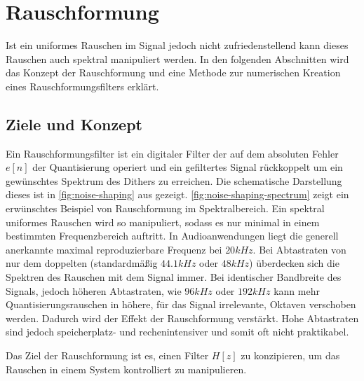 \section{Rauschformung}

Ist ein uniformes Rauschen im Signal jedoch nicht zufriedenstellend kann dieses Rauschen auch spektral manipuliert werden.
In den folgenden Abschnitten wird das Konzept der Rauschformung und eine Methode zur numerischen Kreation eines Rauschformungsfilters erklärt.

\subsection{Ziele und Konzept}

Ein Rauschformungsfilter ist ein digitaler Filter der auf dem absoluten Fehler $e[n]$ der Quantisierung operiert und ein gefiltertes Signal rückkoppelt um ein gewünschtes Spektrum des Dithers zu erreichen.
Die schematische Darstellung dieses ist in \autoref{fig:noise-shaping} aus \autocite{noise-shaping} gezeigt.
\autoref{fig:noise-shaping-spectrum} zeigt ein erwünschtes Beispiel von Rauschformung im Spektralbereich.
Ein spektral uniformes Rauschen wird so manipuliert, sodass es nur minimal in einem bestimmten Frequenzbereich auftritt.
In Audioanwendungen liegt die generell anerkannte maximal reproduzierbare Frequenz bei $20\si{kHz}$.
Bei Abtastraten von nur dem doppelten (standardmäßig $44.1\si{kHz}$ oder $48\si{kHz}$) überdecken sich die Spektren des Rauschen mit dem Signal immer.
Bei identischer Bandbreite des Signals, jedoch höheren Abtastraten, wie $96\si{kHz}$ oder $192\si{kHz}$ kann mehr Quantisierungsrauschen in höhere, für das Signal irrelevante, Oktaven verschoben werden.
Dadurch wird der Effekt der Rauschformung verstärkt.
Hohe Abtastraten sind jedoch speicherplatz- und rechenintensiver und somit oft nicht praktikabel.

Das Ziel der Rauschformung ist es, einen Filter $H[z]$ zu konzipieren, um das Rauschen in einem System kontrolliert zu manipulieren.

